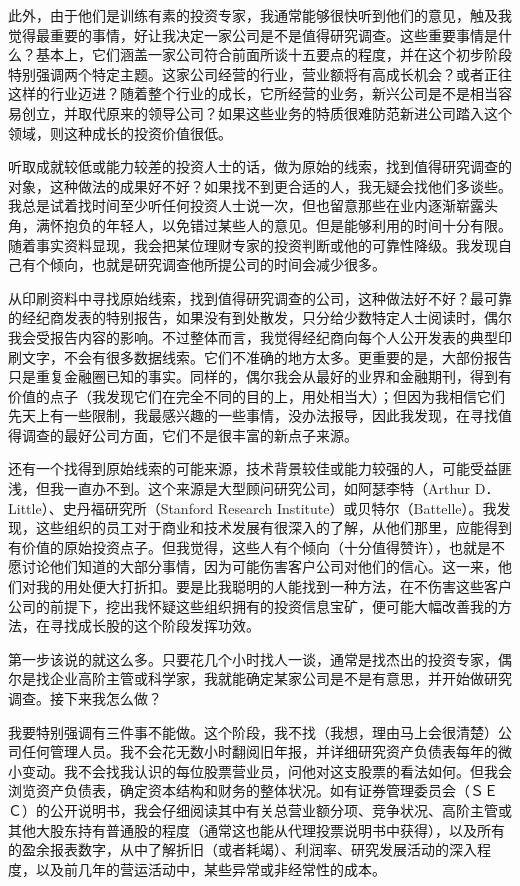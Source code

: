 \documentclass[UTF8,a4paper,zihao=-4,fontset = windows]{ctexart} %
\begin{document}
此外，由于他们是训练有素的投资专家，我通常能够很快听到他们的意见，触及我觉得最重要的事情，好让我决定一家公司是不是值得研究调查。这些重要事情是什么？基本上，它们涵盖一家公司符合前面所谈十五要点的程度，并在这个初步阶段特别强调两个特定主题。这家公司经营的行业，营业额将有高成长机会？或者正往这样的行业迈进？随着整个行业的成长，它所经营的业务，新兴公司是不是相当容易创立，并取代原来的领导公司？如果这些业务的特质很难防范新进公司踏入这个领域，则这种成长的投资价值很低。

听取成就较低或能力较差的投资人士的话，做为原始的线索，找到值得研究调查的对象，这种做法的成果好不好？如果找不到更合适的人，我无疑会找他们多谈些。我总是试着找时间至少听任何投资人士说一次，但也留意那些在业内逐渐崭露头角，满怀抱负的年轻人，以免错过某些人的意见。但是能够利用的时间十分有限。随着事实资料显现，我会把某位理财专家的投资判断或他的可靠性降级。我发现自己有个倾向，也就是研究调查他所提公司的时间会减少很多。

从印刷资料中寻找原始线索，找到值得研究调查的公司，这种做法好不好？最可靠的经纪商发表的特别报告，如果没有到处散发，只分给少数特定人士阅读时，偶尔我会受报告内容的影响。不过整体而言，我觉得经纪商向每个人公开发表的典型印刷文字，不会有很多数据线索。它们不准确的地方太多。更重要的是，大部份报告只是重复金融圈已知的事实。同样的，偶尔我会从最好的业界和金融期刊，得到有价值的点子（我发现它们在完全不同的目的上，用处相当大）；但因为我相信它们先天上有一些限制，我最感兴趣的一些事情，没办法报导，因此我发现，在寻找值得调查的最好公司方面，它们不是很丰富的新点子来源。

还有一个找得到原始线索的可能来源，技术背景较佳或能力较强的人，可能受益匪浅，但我一直办不到。这个来源是大型顾问研究公司，如阿瑟李特（Arthur D．Little）、史丹福研究所（Stanford Research Institute）或贝特尔（Battelle）。我发现，这些组织的员工对于商业和技术发展有很深入的了解，从他们那里，应能得到有价值的原始投资点子。但我觉得，这些人有个倾向（十分值得赞许），也就是不愿讨论他们知道的大部分事情，因为可能伤害客户公司对他们的信心。这一来，他们对我的用处便大打折扣。要是比我聪明的人能找到一种方法，在不伤害这些客户公司的前提下，挖出我怀疑这些组织拥有的投资信息宝矿，便可能大幅改善我的方法，在寻找成长股的这个阶段发挥功效。

第一步该说的就这么多。只要花几个小时找人一谈，通常是找杰出的投资专家，偶尔是找企业高阶主管或科学家，我就能确定某家公司是不是有意思，并开始做研究调查。接下来我怎么做？

我要特别强调有三件事不能做。这个阶段，我不找（我想，理由马上会很清楚）公司任何管理人员。我不会花无数小时翻阅旧年报，并详细研究资产负债表每年的微小变动。我不会找我认识的每位股票营业员，问他对这支股票的看法如何。但我会浏览资产负债表，确定资本结构和财务的整体状况。如有证券管理委员会（ＳＥＣ）的公开说明书，我会仔细阅读其中有关总营业额分项、竞争状况、高阶主管或其他大股东持有普通股的程度（通常这也能从代理投票说明书中获得），以及所有的盈余报表数字，从中了解折旧（或者耗竭）、利润率、研究发展活动的深入程度，以及前几年的营运活动中，某些异常或非经常性的成本。
\end{document}
